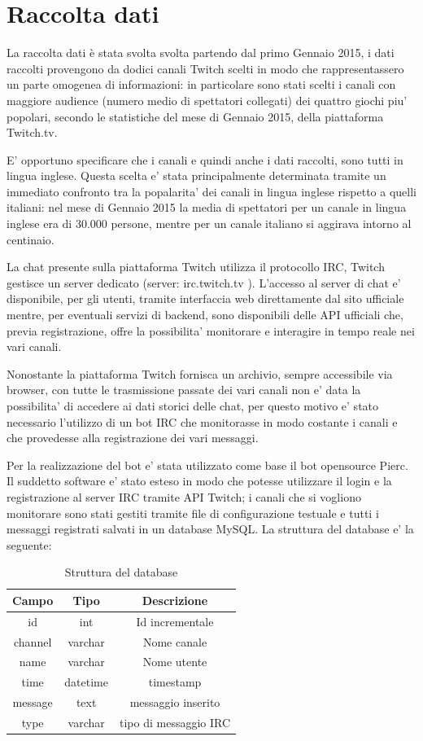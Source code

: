 \documentclass[a4paper,12pt,openright,twoside]{report}
\theoremstyle{definition}
\begin{document}
\section{Raccolta dati}
La raccolta dati è stata svolta svolta partendo dal primo Gennaio 2015, i dati raccolti provengono da dodici canali Twitch scelti in modo che rappresentassero un parte omogenea di informazioni:
in particolare sono stati scelti i canali con maggiore audience (numero medio di spettatori collegati) 
dei quattro giochi piu' popolari, secondo le statistiche del mese di Gennaio 2015, della piattaforma Twitch.tv.

E' opportuno specificare che i canali e quindi anche i dati raccolti, sono tutti in lingua inglese.
Questa scelta e' stata principalmente determinata tramite un immediato confronto tra
la popalarita' dei canali in lingua inglese rispetto a quelli italiani: nel mese di Gennaio 2015
la media di spettatori per un canale in lingua inglese era di 30.000 persone, mentre
per un canale italiano si aggirava intorno al centinaio.

La chat presente sulla piattaforma Twitch utilizza il protocollo IRC, Twitch gestisce un server dedicato (server: irc.twitch.tv ). 
L'accesso al server di chat e' disponibile,
per gli utenti, tramite interfaccia web direttamente dal sito ufficiale mentre, per eventuali servizi di backend, sono disponibili
delle API ufficiali che, previa registrazione, offre la possibilita' monitorare e interagire in tempo reale nei vari canali.

Nonostante la piattaforma Twitch fornisca un archivio, sempre accessibile via browser, con tutte le trasmissione 
passate dei vari canali non e' data la possibilita' di accedere
ai dati storici delle chat, per questo motivo e' stato necessario l'utilizzo di un bot IRC che monitorasse in modo costante i canali e che provedesse alla registrazione dei vari messaggi.

Per la realizzazione del bot e' stata utilizzato come base il bot opensource Pierc. Il suddetto software e' stato esteso in modo che potesse utilizzare il login e la registrazione al server IRC
tramite API Twitch; i canali che si vogliono monitorare sono stati gestiti tramite file di configurazione testuale e tutti i messaggi registrati salvati in un database MySQL.
La struttura del database e' la seguente:

\begin{table}
	\centering
	\begin{tabular}{|c|c|c|}
		\hline
		Campo & Tipo & Descrizione \\
		\hline
		\hline
		id & int & Id incrementale \\
		\hline
		channel & varchar & Nome canale \\
		\hline
		name & varchar & Nome utente \\
		\hline
		time & datetime & timestamp \\
		\hline
		message & text & messaggio inserito \\
		\hline
		type & varchar & tipo di messaggio IRC \\
		\hline
	\end{tabular}
	\caption{Struttura del database}
	\label{tab:strutturaDB}
\end{table}
\end{document}
